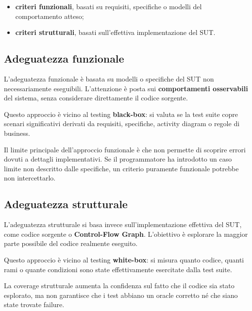 \begin{itemize}
    \item \textbf{criteri funzionali}, basati su requisiti, specifiche o modelli del comportamento atteso;
    \item \textbf{criteri strutturali}, basati sull'effettiva implementazione del SUT.
\end{itemize}

\subsection{Adeguatezza funzionale}

L'adeguatezza funzionale è basata su modelli o specifiche del SUT non necessariamente eseguibili. L'attenzione è posta sui \textbf{comportamenti osservabili} del sistema, senza considerare direttamente il codice sorgente.

Questo approccio è vicino al testing \textbf{black-box}: si valuta se la test suite copre scenari significativi derivati da requisiti, specifiche, activity diagram o regole di business.

\begin{notaslide}
Il limite principale dell'approccio funzionale è che non permette di scoprire errori dovuti a dettagli implementativi. Se il programmatore ha introdotto un caso limite non descritto dalle specifiche, un criterio puramente funzionale potrebbe non intercettarlo.
\end{notaslide}

\subsection{Adeguatezza strutturale}

L'adeguatezza strutturale si basa invece sull'implementazione effettiva del SUT, come codice sorgente o \textbf{Control-Flow Graph}. L'obiettivo è esplorare la maggior parte possibile del codice realmente eseguito.

Questo approccio è vicino al testing \textbf{white-box}: si misura quanto codice, quanti rami o quante condizioni sono state effettivamente esercitate dalla test suite.

\begin{notaesame}
La coverage strutturale aumenta la confidenza sul fatto che il codice sia stato esplorato, ma non garantisce che i test abbiano un oracle corretto né che siano state trovate failure.
\end{notaesame}

